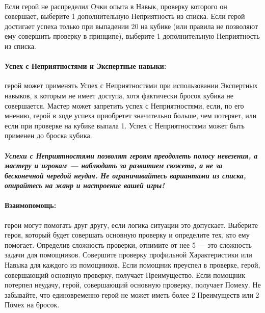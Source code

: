 \paragraph{}Если герой не распределил Очки опыта в Навык, проверку которого он совершает, выберите 1 дополнительную Неприятность из списка.
Если герой достигает успеха только при выпадении 20 на кубике (или правила не позволяют ему совершить проверку в принципе), выберите 1 дополнительную Неприятность из списка.
\paragraph{Успех с Неприятностями и Экспертные навыки:} герой может применять Успех с Неприятностями при использовании Экспертных навыков, к которым не имеет доступа, хотя фактически бросок кубика не совершается.
Мастер может запретить успех с Неприятностями, если, по его мнению, герой в ходе успеха приобретет значительно больше, чем потеряет, или если при проверке на кубике выпала 1. Успех с Неприятностями может быть применен до броска кубика.
\paragraph{\textit{Успехи с Неприятностями позволят героям преодолеть полосу невезения, а мастеру и игрокам — наблюдать за развитием сюжета, а не за бесконечной чередой неудач. Не ограничивайтесь вариантами из списка, опирайтесь на жанр и настроение вашей игры!}}
\paragraph{Взаимопомощь:} герои могут помогать друг другу, если логика ситуации это допускает. Выберите героя, который будет совершать основную проверку и определите тех, кто ему помогает. Определив сложность проверки, отнимите от нее 5 — это сложность задачи для помощников. Совершите проверку профильной Характеристики или Навыка для каждого из помощников. Если помощник преуспел в проверке, герой, совершающий основную проверку, получает Преимущество. Если помощник потерпел неудачу, герой, совершающий основную проверку, получает Помеху. Не забывайте, что единовременно герой не может иметь более 2 Преимуществ или 2 Помех на бросок.